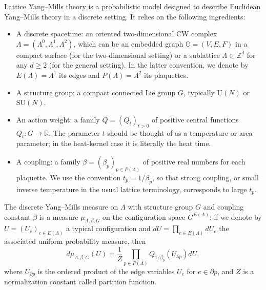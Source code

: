 \documentclass[11pt,a4paper,reqno]{amsart}
\theoremstyle{definition}
\theoremstyle{remark}
\newcommand\U{{\mathrm U}}
\newcommand\SU{{\mathrm {SU}}}
\newcommand\Z{{\mathbb{Z}}}
\newcommand\R{{\mathbb R}}
\begin{document}
Lattice Yang--Mills theory is a probabilistic model designed to describe Euclidean Yang--Mills theory in a discrete setting. It relies on the following ingredients:
\begin{itemize}
\item A discrete spacetime: an oriented two-dimensional CW complex $\Lambda=(\Lambda^0,\Lambda^1,\Lambda^2)$, which can be an embedded graph $\mathbb G=(V,E,F)$ in a compact surface (for the two-dimensional setting) or a sublattice $\Lambda\subset\Z^d$ for any $d\geq 2$ (for the general setting). In the latter convention, we denote by $E(\Lambda)=\Lambda^1$ its edges and $P(\Lambda)=\Lambda^2$ its plaquettes.
\item A structure group: a compact connected Lie group $G$, typically $\U(N)$ or $\SU(N)$.

\item An action weight: a family $Q=(Q_t)_{t>0}$ of positive central functions $Q_t:G\to\R$.  The parameter $t$ should be thought of as a temperature or area parameter; in the heat-kernel case it is literally the heat time.
\item A coupling: a family $\beta=(\beta_p)_{p\in P(\Lambda)}$ of positive real numbers for each plaquette.  We use the convention $t_p=1/\beta_p$, so that strong coupling, or small inverse temperature in the usual lattice terminology, corresponds to large $t_p$.
\end{itemize}
The discrete Yang--Mills measure on $\Lambda$ with structure group $G$ and coupling constant $\beta$ is a measure $\mu_{\Lambda,\beta,G}$ on the configuration space $G^{E(\Lambda)}$: if we denote by $U=(U_e)_{e\in E(\Lambda)}$ a typical configuration and $dU=\prod_{e\in E(\Lambda)}dU_e$ the associated uniform probability measure, then
\[
d\mu_{\Lambda,\beta,G}(U)=\frac{1}{Z}\prod_{p\in P(\Lambda)}Q_{1/\beta_p}(U_{\partial p})dU,
\]
where $U_{\partial p}$ is the ordered product of the edge variables $U_e$ for $e\in\partial p$, and $Z$ is a normalization constant called partition function.
\end{document}
